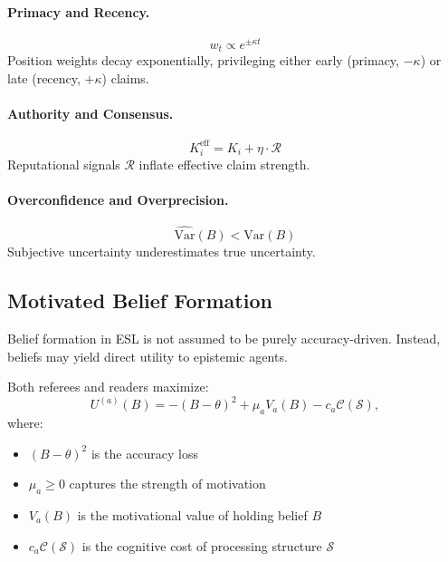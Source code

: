 \documentclass[11pt,a4paper]{article}
\begin{document}
\paragraph{Primacy and Recency.}
\begin{equation}
w_t \propto e^{\pm \kappa t}
\end{equation}
Position weights decay exponentially, privileging either early (primacy, $-\kappa$) or late (recency, $+\kappa$) claims.

\paragraph{Authority and Consensus.}
\begin{equation}
K_i^{\text{eff}} = K_i + \eta \cdot \mathcal{R}
\end{equation}
Reputational signals $\mathcal{R}$ inflate effective claim strength.

\paragraph{Overconfidence and Overprecision.}
\begin{equation}
\widehat{\mathrm{Var}}(B) < \mathrm{Var}(B)
\end{equation}
Subjective uncertainty underestimates true uncertainty.


\subsection{Motivated Belief Formation}

Belief formation in ESL is not assumed to be purely accuracy-driven. Instead, beliefs may yield direct utility to epistemic agents.

\begin{termbox}
Both referees and readers maximize:
\begin{equation}
U^{(a)}(B) = - (B - \theta)^2 + \mu_a V_a(B) - c_a \mathcal{C}(\mathcal{S}),
\end{equation}
where:
\begin{itemize}
    \item $(B - \theta)^2$ is the accuracy loss
    \item $\mu_a \geq 0$ captures the strength of motivation
    \item $V_a(B)$ is the motivational value of holding belief $B$
    \item $c_a \mathcal{C}(\mathcal{S})$ is the cognitive cost of processing structure $\mathcal{S}$
\end{itemize}
\end{termbox}
\end{document}
